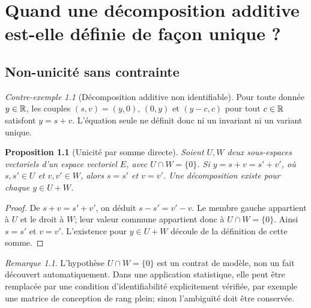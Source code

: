 \documentclass[11pt,oneside]{book}
\newtheorem{proposition}[theoreme]{Proposition}
\theoremstyle{definition}\newtheorem{definition}[theoreme]{Définition}\newtheorem{hypothese}[theoreme]{Hypothèse explicite}\newtheorem{convention}[theoreme]{Convention}\newtheorem{critere}[theoreme]{Critère}
\theoremstyle{remark}\newtheorem{remarque}[theoreme]{Remarque}\newtheorem{contreexemple}[theoreme]{Contre-exemple}
\begin{document}
\chapter{Quand une décomposition additive est-elle définie de façon unique ?}
\section{Non-unicité sans contrainte}
\begin{contreexemple}[Décomposition additive non identifiable]
Pour toute donnée \(y\in\mathbb R\), les couples \((s,v)=(y,0)\), \((0,y)\) et \((y-c,c)\) pour tout \(c\in\mathbb R\) satisfont \(y=s+v\). L'équation seule ne définit donc ni un invariant ni un variant unique.
\end{contreexemple}
\begin{proposition}[Unicité par somme directe]
Soient \(U,W\) deux sous-espaces vectoriels d'un espace vectoriel \(E\), avec \(U\cap W=\{0\}\). Si \(y=s+v=s'+v'\), où \(s,s'\in U\) et \(v,v'\in W\), alors \(s=s'\) et \(v=v'\). Une décomposition existe pour chaque \(y\in U+W\).
\end{proposition}
\begin{proof}
De \(s+v=s'+v'\), on déduit \(s-s'=v'-v\). Le membre gauche appartient à \(U\) et le droit à \(W\); leur valeur commune appartient donc à \(U\cap W=\{0\}\). Ainsi \(s=s'\) et \(v=v'\). L'existence pour \(y\in U+W\) découle de la définition de cette somme.\end{proof}
\begin{remarque}
L'hypothèse \(U\cap W=\{0\}\) est un contrat de modèle, non un fait découvert automatiquement. Dans une application statistique, elle peut être remplacée par une condition d'identifiabilité explicitement vérifiée, par exemple une matrice de conception de rang plein; sinon l'ambiguïté doit être conservée.
\end{remarque}
\end{document}
